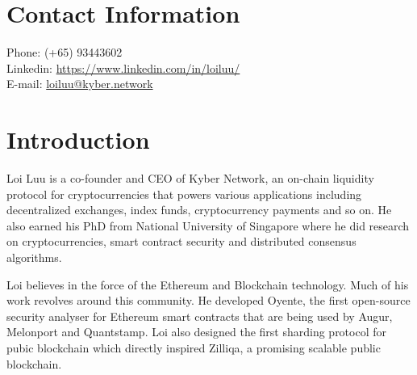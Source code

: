 \documentclass[margin,line]{res}
\begin{document}

\begin{resume}
\section{\sc Contact Information}
\vspace{.05in}
{Phone: } (+65) 93443602 \\            
{ Linkedin:} \href{https://www.linkedin.com/in/loiluu/}{https://www.linkedin.com/in/loiluu/}\\         
{ E-mail:}  \href{mailto:loiluu@kyber.network}{\textsf{loiluu@kyber.network}} \\       


\section{\sc Introduction}
Loi Luu is a co-founder and CEO of Kyber Network, an on-chain liquidity protocol for cryptocurrencies that powers various applications including decentralized exchanges, index funds, cryptocurrency payments and so on. He also earned his PhD from National University of Singapore where he did research on cryptocurrencies, smart contract security and distributed consensus algorithms. 

Loi believes in the force of the Ethereum and Blockchain technology. Much of his work revolves around this community. He developed Oyente, the first open-source security analyser for Ethereum smart contracts that are being used by Augur, Melonport and Quantstamp. Loi also designed the first sharding protocol for pubic blockchain which directly inspired Zilliqa, a promising scalable public blockchain.


\end{resume}
\end{document}
